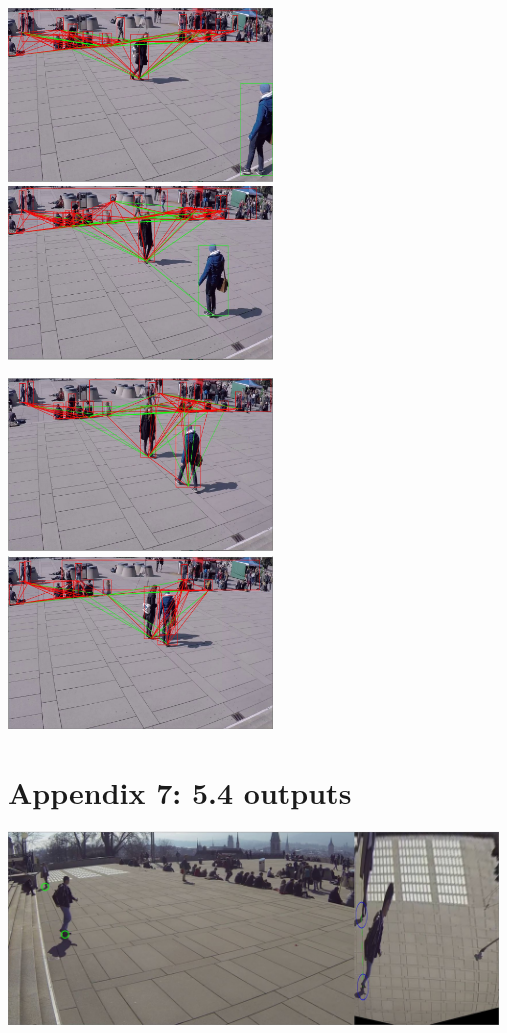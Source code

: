 \documentclass[12pt]{report}
\begin{document}
\includegraphics[width=70mm]{./images/appendix/Cam7Clip1BoundingBoxTest1.JPG}
\includegraphics[width=70mm]{./images/appendix/Cam7Clip1BoundingBoxTest2.JPG}

\includegraphics[width=70mm]{./images/appendix/Cam7Clip1BoundingBoxTest3.JPG}
\includegraphics[width=70mm]{./images/appendix/Cam7Clip1BoundingBoxTest5.JPG}

\pagebreak
\section*{Appendix 7: 5.4 outputs}
\includegraphics[width=130mm]{./images/appendix/MatrixTransExample1.JPG}
\end{document}
